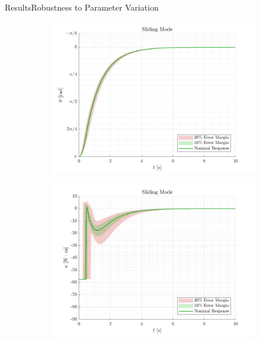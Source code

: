 \begin{frame}{Results}{Robustness to Parameter Variation}
\begin{figure}[H]
  \begin{minipage}{0.45\linewidth}
    \begin{figure}[H]
      \centering
      \includegraphics[width=\linewidth]{figures/slidingMode}
    \end{figure}        
  \end{minipage}\hfill      
  \begin{minipage}{0.45\linewidth}
    \begin{figure}[H]
      \centering
      \includegraphics[width=1\linewidth]{figures/slidingMode_u}
    \end{figure}                
  \end{minipage}\hfill \\
\end{figure}
\end{frame}

